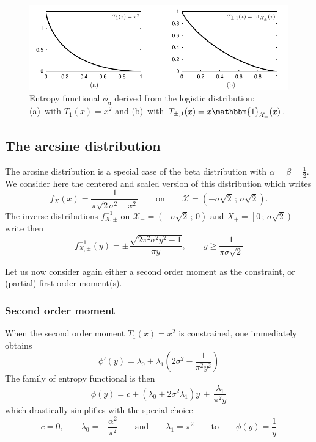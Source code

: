 \documentclass[english,sort&compress]{elsarticle}
\theoremstyle{definition}
\theoremstyle{plain}
\theoremstyle{plain}
\def\X{\mathcal{X}}
\def\un{\mathbbm{1}}
\begin{document}
\begin{figure}[htbp]
\centerline{\includegraphics[width=.9\textwidth]{PDF/MaxEnt_LogisticLaw}}
\caption{Entropy  functional  $\phi_{\mathrm{u}}$   derived  from  the  logistic
  distribution:  (a)~with  $T_1(x)  =   x^2$  and  (b)~with  $T_{\pm,1}(x)  =  x
  \un_{\X_\pm}(x)$.}
\label{fig:Entropy-logistic}
\end{figure}




\subsection{The arcsine distribution}
\label{subsec:Arcsine}

The arcsine distribution is a special case of the beta distribution with $\alpha
= \beta  = \frac12$. We  consider here the  centered and scaled version  of this
distribution which writes
%
\[
f_X(x) = \frac{1}{\pi\sqrt{ 2 \, \sigma^2 - x^2}} \qquad \mbox{on} \qquad \X = \left(
- \sigma \sqrt2 \, ; \, \sigma \sqrt2 \right).
\]
%
The inverse distributions $f_{X,\pm}^{-1}$ on $\X_-  = \left( - \sigma \sqrt2 \,
; \, 0 \right)$ and $X_+ = \left[ 0 \, ; \, \sigma \sqrt2 \right)$ write then
%
\[
f_{X,\pm}^{-1}(y) = \pm \frac{\sqrt{2 \pi^2  \sigma^2 y^2 - 1}}{\pi y}, \qquad y
\ge \frac{1}{\pi \sigma \sqrt2}
\]


Let us  now consider again  either a second  order moment as the  constraint, or
(partial) first order moment(s).



\subsubsection{Second order moment}

When  the second order  moment $T_1(x)  = x^2$  is constrained,  one immediately
obtains
%
\[
\phi'(y)=\lambda_0 + \lambda_1\left(2\sigma^{2}-\frac{1}{\pi^{2}y^{2}}\right)
\]
%
The family of entropy functional is then 
%
\[
\phi(y)  = c  +  \left( \lambda_0  +  2 \sigma^2  \lambda_1 \right)  y  \, +  \,
\frac{\lambda_1}{\pi^2 y}
\]
%
which    drastically   simplifies    with    the   special choice
%
\[
c  = 0,  \qquad \lambda_0  = -  \frac{\alpha^2}{\pi^2} \qquad  \mbox{and} \qquad
\lambda_1 = \pi^2 \qquad \mbox{to} \qquad\phi(y) = \frac{1}{y}
\]
%
\end{document}

